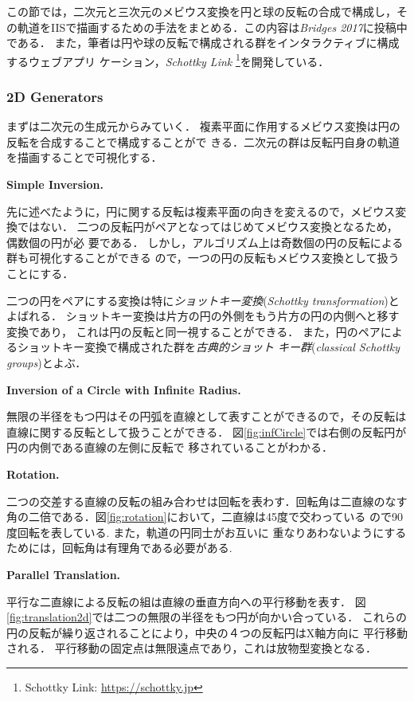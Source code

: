 この節では，二次元と三次元のメビウス変換を円と球の反転の合成で構成し，そ
の軌道をIISで描画するための手法をまとめる．この内容は\textit{Bridges
2017}に投稿中である．
また，筆者は円や球の反転で構成される群をインタラクティブに構成するウェブアプリ
ケーション，{\it Schottky Link} \footnote{Schottky Link:
\url{https://schottky.jp}}を開発している．

\subsubsection{2D Generators}

まずは二次元の生成元からみていく．
複素平面に作用するメビウス変換は円の反転を合成することで構成することがで
きる．二次元の群は反転円自身の軌道を描画することで可視化する．

\noindent\textbf{Simple Inversion.}

先に述べたように，円に関する反転は複素平面の向きを変えるので，メビウス変
換ではない．
二つの反転円がペアとなってはじめてメビウス変換となるため，偶数個の円が必
要である．
しかし，アルゴリズム上は奇数個の円の反転による群も可視化することができる
ので，一つの円の反転もメビウス変換として扱うことにする．

二つの円をペアにする変換は特に\emph{ショットキー変換}(\textit{Schottky
transformation})とよばれる．
ショットキー変換は片方の円の外側をもう片方の円の内側へと移す変換であり，
これは円の反転と同一視することができる．
また，円のペアによるショットキー変換で構成された群を\emph{古典的ショット
キー群}(\textit{classical Schottky groups})とよぶ．

\noindent\textbf{Inversion of a Circle with Infinite Radius.}

無限の半径をもつ円はその円弧を直線として表すことができるので，その反転は
直線に関する反転として扱うことができる．
図\ref{fig:infCircle}では右側の反転円が円の内側である直線の左側に反転で
移されていることがわかる．

\noindent\textbf{Rotation.}

二つの交差する直線の反転の組み合わせは回転を表わす．回転角は二直線のなす
角の二倍である．図\ref{fig:rotation}において，二直線は45度で交わっている
ので90度回転を表している. また，軌道の円同士がお互いに
重なりあわないようにするためには，回転角は有理角である必要がある.

\noindent\textbf{Parallel Translation.}

平行な二直線による反転の組は直線の垂直方向への平行移動を表す．
図\ref{fig:translation2d}では二つの無限の半径をもつ円が向かい合っている．
これらの円の反転が繰り返されることにより，中央の４つの反転円はX軸方向に
平行移動される．
平行移動の固定点は無限遠点であり，これは放物型変換となる．

